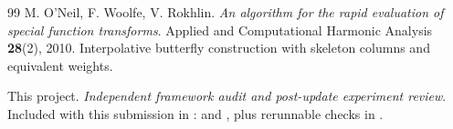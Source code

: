 \documentclass[11pt,a4paper]{article}
\begin{document}
\begin{thebibliography}{99}
 M. O'Neil, F. Woolfe, V. Rokhlin.
\emph{An algorithm for the rapid evaluation of special function transforms}. Applied and Computational Harmonic Analysis \textbf{28}(2), 2010.
Interpolative butterfly construction with skeleton columns and equivalent weights.

 This project.
\emph{Independent framework audit and post-update experiment review}.
Included with this submission in :  and , plus rerunnable checks in .
\end{thebibliography}
\end{document}
